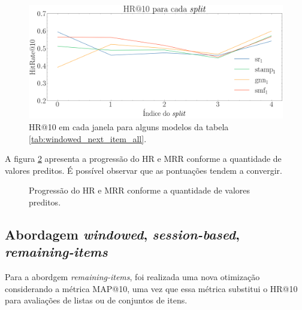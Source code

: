 \begin{figure}[htbp]
  \centering
  \includegraphics[width=1\textwidth]{chapters/chap04/images/hr10_splits.png}
  \caption{HR@10 em cada janela para alguns modelos da tabela
  \ref{tab:windowed_next_item_all}.}
  \label{fig:next-item-single}
\end{figure}


A figura \ref{fig:progressao} apresenta a progressão do HR e MRR conforme a
quantidade de valores preditos. É possível observar que as pontuações tendem
a convergir.


\begin{figure}[htbp]
  \hfill
  \hfill
  \hfill
  \caption{Progressão do HR e MRR conforme a quantidade de valores preditos.}
  \label{fig:progressao}
  \end{figure}

\subsection{Abordagem \textit{windowed}, \textit{session-based}, \textit{remaining-items}}
Para a abordgem \textit{remaining-items}, foi realizada uma nova otimização
considerando a métrica MAP@10, uma vez que essa métrica substitui o HR@10 para
avaliações de listas ou de conjuntos de itens.

